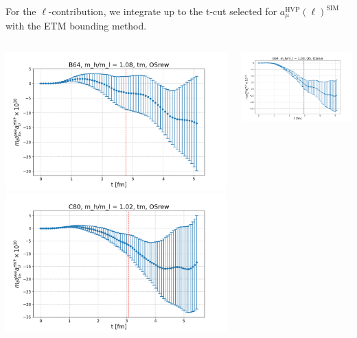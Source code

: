 \documentclass[xcolor={dvipsnames,table}]{beamer}
\begin{document}
\begin{frame}
  For the $\ell$-contribution, we integrate up to the t-cut selected for $a_\mu^\mathrm{HVP}(\ell)^\mathrm{SIM}$ with the ETM bounding method.
  \begin{columns}
    \begin{column}{0.5\textwidth}
      \includegraphics[trim=0cm 0.3cm 0cm 1.2cm, clip,width=\textwidth]{plots/der_mq_sea_lore/amu_B64_tm_der_001ml.png}
      \includegraphics[trim=0cm 0.3cm 0cm 1.2cm, clip,width=\textwidth]{plots/der_mq_sea_lore/amu_C80_tm_der_001ml.png}
    \end{column}
    \begin{column}{0.5\textwidth}
      \includegraphics[trim=0cm 0.3cm 0cm 1.2cm, clip,width=\textwidth]{plots/der_mq_sea_lore/amu_B64_OS_der_001ml.png}

\end{column}
\end{columns}
\end{frame}
\end{document}
